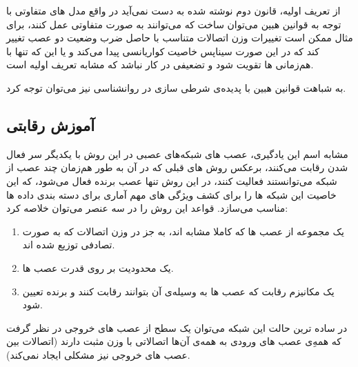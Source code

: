 \documentclass[11pt,a4paper,twocolumn]{article}
\begin{document}
از تعریف اولیه، قانون دوم نوشته شده به دست نمی‌آید در واقع مدل های متفاوتی با توجه به قوانین هبین می‌توان ساخت که می‌توانند به صورت متفاوتی عمل کنند، برای مثال ممکن است تغییرات وزن اتصالات متناسب با حاصل ضرب وضعیت دو عصب تغییر کند که در این صورت سیناپس خاصیت کواریانسی پیدا می‌کند و یا این که تنها با هم‌زمانی ها تقویت شود و تضعیفی در کار نباشد که مشابه تعریف اولیه است.

به شباهت قوانین هبین با پدیده‌ی شرطی سازی در روانشناسی نیز می‌توان توجه کرد.

\subsection{آموزش رقابتی}
مشابه اسم این یادگیری، عصب های شبکه‌های عصبی در این روش با یکدیگر سر فعال شدن رقابت می‌کنند، برعکس روش های قبلی که در آن به طور هم‌زمان چند عصب از شبکه می‌توانستند فعالیت کنند، در این روش تنها عصب برنده فعال می‌شود، که این خاصیت این شبکه ها را برای کشف ویژگی های مهم آماری برای دسته بندی داده ها مناسب می‌سازد.
قواعد این روش را در سه عنصر می‌توان خلاصه کرد:
\begin{enumerate}
\item
یک مجموعه از عصب ها که کاملا مشابه اند، به جز در وزن اتصالات که به صورت تصادفی توزیع شده اند.
\item
یک محدودیت بر روی قدرت عصب ها.
\item
یک مکانیزم رقابت که عصب ها به وسیله‌ی آن بتوانند رقابت کنند و برنده تعیین شود.
\end{enumerate}
در ساده ترین حالت این شبکه می‌توان یک سطح از عصب های خروجی در نظر گرفت که همه‌ِی عصب های ورودی به همه‌ی آن‌ها اتصالاتی با وزن مثبت دارند (اتصالات بین عصب های خروجی نیز مشکلی ایجاد نمی‌کند).
\end{document}
